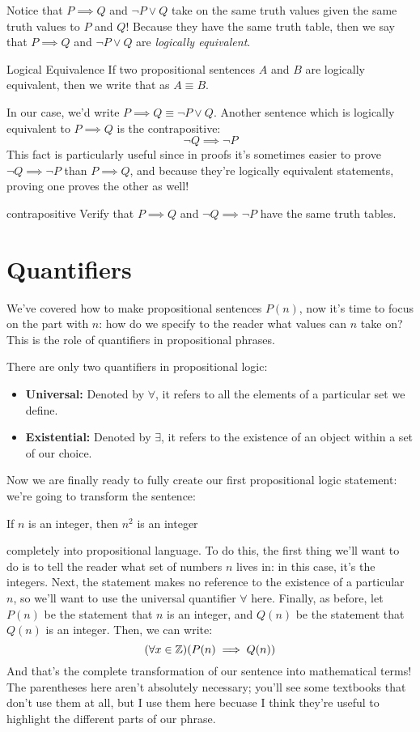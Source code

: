Notice that \( P \implies Q \) and \( \neg P \lor Q \) take on the same truth values given the same truth 
values to \( P \) and \( Q \)! Because they have the same truth table, then we say that \( P \implies Q \) 
and \( \neg P \lor Q \) are \textit{logically equivalent}. 
\begin{notation}{Logical Equivalence}{}
	If two propositional sentences  \( A \) and \( B \) are logically equivalent, then we write that as 
	\( A \equiv B \).
\end{notation}
In our case, we'd write \( P \implies Q \equiv \neg P \lor Q \). Another sentence which is logically equivalent 
to \( P \implies Q \) is the contrapositive:
\[
\neg Q \implies \neg P
\] 
This fact is particularly useful since in proofs it's sometimes easier to prove \( \neg Q \implies \neg P \) 
than \( P \implies Q  \), and because they're logically equivalent statements, proving one proves the other 
as well!
\begin{exercise}{}{contrapositive}
	Verify that \( P \implies Q \) and \( \neg Q \implies \neg P \) have the same truth tables. 
\end{exercise}
\section{Quantifiers}
We've covered how to make propositional sentences \( P(n) \), now it's time to focus on the part with \( n \): 
how do we specify to the reader what values can \( n \) take on? This is the role of quantifiers in
propositional phrases. 

There are only two quantifiers in propositional logic:
\begin{itemize}
	\item \textbf{Universal:} Denoted by \( \forall \), it refers to all the elements of a particular set 
		we define. 
	\item \textbf{Existential:} Denoted by \( \exists \), it refers to the existence of an object within a set of 
		our choice. 
\end{itemize}
Now we are finally ready to fully create our first propositional logic statement: we're going to transform the 
sentence:
\begin{center}
	If \( n \) is an integer, then \( n^2 \) is an integer
\end{center}
completely into propositional language. To do this, the first thing we'll want to do is to tell the reader what set 
of numbers \( n \) lives in: in this case, it's the integers. Next, the statement makes no reference to 
the existence of a particular \( n \), so we'll want to 
use the universal quantifier \( \forall \) here. Finally, as before, let \( P(n) \) be the statement that 
\( n \) is an integer, and \( Q(n) \) be the statement that \( Q(n) \) is an integer. Then, we can write:
\[
	(\forall x \in \mathbb Z) (P(n) \implies Q(n))
\] 
And that's the complete transformation of our sentence into mathematical terms! The parentheses here aren't absolutely
necessary; you'll see some textbooks that don't use them at all, but I use them here becuase I think they're useful to 
highlight the different parts of our phrase. 

